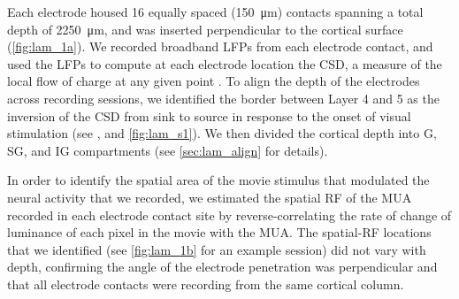 Each electrode housed \num{16} equally spaced (\SI{150}{\micro\metre}) contacts spanning a total depth of \SI{2250}{\micro\metre}, and was inserted perpendicular to the cortical surface (\autoref{fig:lam_1a}).
We recorded broadband \acp{LFP} from each electrode contact, and used the \acp{LFP} to compute at each electrode location the \ac{CSD}, a measure of the local flow of charge at any given point \citep{Einevoll2013}.
To align the depth of the electrodes across recording sessions, we identified the border between Layer 4 and 5 as the inversion of the \ac{CSD} from sink to source in response to the onset of visual stimulation (see \citealp{Schroeder1991}, and \autoref{fig:lam_s1}).
We then divided the cortical depth into \acf{G}, \acf{SG}, and \acf{IG} compartments (see \autoref{sec:lam_align} for details).

In order to identify the spatial area of the movie stimulus that modulated the neural activity that we recorded, we estimated the spatial \ac{RF} of the \ac{MUA} recorded in each electrode contact site by reverse-correlating the rate of change of luminance of each pixel in the movie with the \ac{MUA}.
The spatial-\ac{RF} locations that we identified (see \autoref{fig:lam_1b} for an example session) did not vary with depth, confirming the angle of the electrode penetration was perpendicular and that all electrode contacts were recording from the same cortical column.


